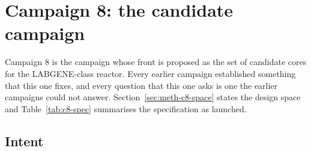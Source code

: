%
%

\section{Campaign 8: the candidate campaign}
\label{sec:res-c8}

Campaign 8 is the campaign whose front is proposed as the set of
candidate cores for the LABGENE-class reactor. Every earlier campaign
established something that this one fixes, and every question that
this one asks is one the earlier campaigns could not answer.
Section~\ref{sec:meth-c8-space} states the design space and
Table~\ref{tab:c8-spec} summarises the specification as launched.

\subsection{Intent}
\label{sec:res-c8-intent}

